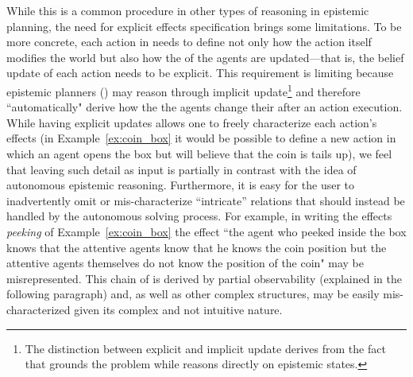 While this is a common procedure in other types of reasoning in epistemic planning, the need for explicit effects specification brings some limitations.
To be more concrete, each action in \pdkbpddl needs to define not only how the action itself modifies the world but also how the \knobel of the agents are updated---that is, the belief update of each action needs to be explicit. 
This requirement is limiting because epistemic planners (\eg \EFP) may reason through implicit \knobel update\footnote{The distinction between explicit and implicit \knobel update derives from the fact that \rpmep grounds the problem while \EFP reasons directly on epistemic states.} and therefore ``automatically" derive how the the agents change their \knobel after an action execution.
While having explicit updates allows one to freely characterize each action's effects (\eg in Example~\ref{ex:coin_box} it would be possible to define a new action in which an agent opens the box but will believe that the coin is tails up), we feel that leaving such detail as input is partially in contrast with the idea of autonomous epistemic reasoning. %
Furthermore, it is easy for the user to inadvertently omit or mis-characterize ``intricate'' \knobel relations that should instead be handled by the autonomous solving process. For example, in writing the effects \emph{peeking} of Example~\ref{ex:coin_box} the effect ``the agent who peeked inside the box knows that the attentive agents know that he knows the coin position but the attentive agents themselves do not know the position of the coin" may be misrepresented.
This chain of \knobel is derived by partial observability (explained in the following paragraph) and, as well as other complex \knobel structures, may be easily mis-characterized given its complex and not intuitive nature.

